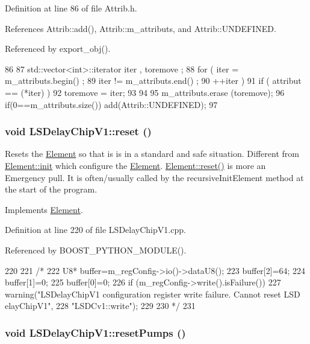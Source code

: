 Definition at line 86 of file Attrib.h.

References Attrib::add(), Attrib::m\_\-attributs, and Attrib::UNDEFINED.

Referenced by export\_\-obj().


\begin{DoxyCode}
86                                {
87     std::vector<int>::iterator iter , toremove ;
88     for ( iter  = m_attributs.begin() ;
89           iter != m_attributs.end()   ;
90           ++iter ) {
91       if ( attribut == (*iter) ) {
92         toremove = iter;
93       }
94     }
95     m_attributs.erase (toremove);
96     if(0==m_attributs.size()) add(Attrib::UNDEFINED);
97   }
\end{DoxyCode}
\hypertarget{classLSDelayChipV1_a6b772084a850e96b2f9bb5600c29259c}{
\subsubsection[{reset}]{\setlength{\rightskip}{0pt plus 5cm}void LSDelayChipV1::reset ()}}
\label{classLSDelayChipV1_a6b772084a850e96b2f9bb5600c29259c}
Resets the \hyperlink{classElement}{Element} so that is is in a standard and safe situation. Different from \hyperlink{classElement_af42754b5cabc198869222725218d695c}{Element::init} which configure the \hyperlink{classElement}{Element}. \hyperlink{classElement_a69efffa22f06909d768149715565cb56}{Element::reset()} is more an Emergency pull. It is often/usually called by the recursiveInitElement method at the start of the program. 

Implements \hyperlink{classElement_a69efffa22f06909d768149715565cb56}{Element}.

Definition at line 220 of file LSDelayChipV1.cpp.

Referenced by BOOST\_\-PYTHON\_\-MODULE().


\begin{DoxyCode}
220                          {
221 /*
222   U8* buffer=m_regConfig->io()->dataU8();
223   buffer[2]=64;
224   buffer[1]=0;
225   buffer[0]=0;
226   if (m_regConfig->write().isFailure()){
227     warning("LSDelayChipV1 configuration register write failure. Cannot reset LSD
      elayChipV1",
228         "LSDCv1::write");
229   }
230   */
231 }
\end{DoxyCode}
\hypertarget{classLSDelayChipV1_a5b2c2e527b044b128306695828e9fd19}{
\subsubsection[{resetPumps}]{\setlength{\rightskip}{0pt plus 5cm}void LSDelayChipV1::resetPumps ()}}
\label{classLSDelayChipV1_a5b2c2e527b044b128306695828e9fd19}


